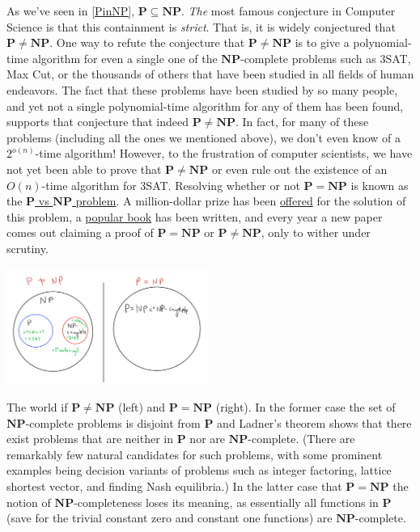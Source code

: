 As we've seen in \cref{PinNP}, \(\mathbf{P} \subseteq \mathbf{NP}\).
\emph{The} most famous conjecture in Computer Science is that this
containment is \emph{strict}. That is, it is widely conjectured that
\(\mathbf{P} \neq \mathbf{NP}\). One way to refute the conjecture that
\(\mathbf{P} \neq \mathbf{NP}\) is to give a polynomial-time algorithm
for even a single one of the \(\mathbf{NP}\)-complete problems such as
3SAT, Max Cut, or the thousands of others that have been studied in all
fields of human endeavors. The fact that these problems have been
studied by so many people, and yet not a single polynomial-time
algorithm for any of them has been found, supports that conjecture that
indeed \(\mathbf{P} \neq \mathbf{NP}\). In fact, for many of these
problems (including all the ones we mentioned above), we don't even know
of a \(2^{o(n)}\)-time algorithm! However, to the frustration of
computer scientists, we have not yet been able to prove that
\(\mathbf{P}\neq\mathbf{NP}\) or even rule out the existence of an
\(O(n)\)-time algorithm for 3SAT. Resolving whether or not
\(\mathbf{P}=\mathbf{NP}\) is known as the
\href{https://en.wikipedia.org/wiki/P_versus_NP_problem}{\(\mathbf{P}\)
vs \(\mathbf{NP}\) problem}. A million-dollar prize has been
\href{http://www.claymath.org/millennium-problems/p-vs-np-problem}{offered}
for the solution of this problem, a
\href{https://www.amazon.com/dp/B00BKZYGUY}{popular book} has been
written, and every year a new paper comes out claiming a proof of
\(\mathbf{P}=\mathbf{NP}\) or \(\mathbf{P}\neq\mathbf{NP}\), only to
wither under scrutiny.


\begin{marginfigure}
\centering
\includegraphics[width=\linewidth, height=1.5in, keepaspectratio]{../figure/PNPscenarios.png}
\caption{The world if \(\mathbf{P}\neq \mathbf{NP}\) (left) and
\(\mathbf{P}=\mathbf{NP}\) (right). In the former case the set of
\(\mathbf{NP}\)-complete problems is disjoint from \(\mathbf{P}\) and
Ladner's theorem shows that there exist problems that are neither in
\(\mathbf{P}\) nor are \(\mathbf{NP}\)-complete. (There are remarkably
few natural candidates for such problems, with some prominent examples
being decision variants of problems such as integer factoring, lattice
shortest vector, and finding Nash equilibria.) In the latter case that
\(\mathbf{P}=\mathbf{NP}\) the notion of \(\mathbf{NP}\)-completeness
loses its meaning, as essentially all functions in \(\mathbf{P}\) (save
for the trivial constant zero and constant one functions) are
\(\mathbf{NP}\)-complete.}
\label{PNPscenariosfig}
\end{marginfigure}


